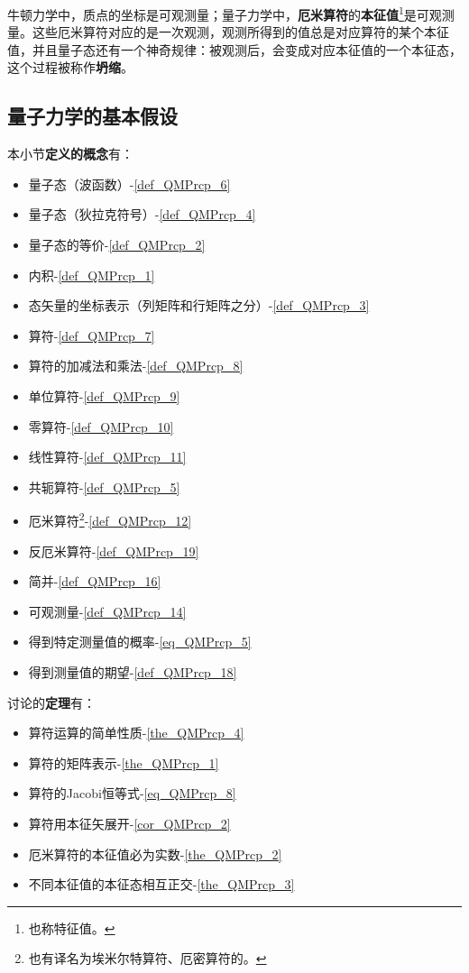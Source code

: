 牛顿力学中，质点的坐标是可观测量；量子力学中，\textbf{厄米算符}的\textbf{本征值}\footnote{也称特征值。}是可观测量。这些厄米算符对应的是一次观测，观测所得到的值总是对应算符的某个本征值，并且量子态还有一个神奇规律：被观测后，会变成对应本征值的一个本征态，这个过程被称作\textbf{坍缩}。


\subsection{量子力学的基本假设}\label{sub_QMPrcp_2}

本小节\textbf{定义的概念}有：

\begin{itemize}
\item 量子态（波函数）-\autoref{def_QMPrcp_6} 
\item 量子态（狄拉克符号）-\autoref{def_QMPrcp_4} 
\item 量子态的等价-\autoref{def_QMPrcp_2} 
\item 内积-\autoref{def_QMPrcp_1} 
\item 态矢量的坐标表示（列矩阵和行矩阵之分）-\autoref{def_QMPrcp_3} 
\item 算符-\autoref{def_QMPrcp_7} 
\item 算符的加减法和乘法-\autoref{def_QMPrcp_8} 
\item 单位算符-\autoref{def_QMPrcp_9} 
\item 零算符-\autoref{def_QMPrcp_10} 
\item 线性算符-\autoref{def_QMPrcp_11} 
\item 共轭算符-\autoref{def_QMPrcp_5} 
\item 厄米算符\footnote{也有译名为埃米尔特算符、厄密算符的。}-\autoref{def_QMPrcp_12} 
\item 反厄米算符-\autoref{def_QMPrcp_19} 
\item 简并-\autoref{def_QMPrcp_16} 
\item 可观测量-\autoref{def_QMPrcp_14} 
\item 得到特定测量值的概率-\autoref{eq_QMPrcp_5} 
\item 得到测量值的期望-\autoref{def_QMPrcp_18} 
\end{itemize}

讨论的\textbf{定理}有：

\begin{itemize}
\item 算符运算的简单性质-\autoref{the_QMPrcp_4} 
\item 算符的矩阵表示-\autoref{the_QMPrcp_1} 
\item 算符的Jacobi恒等式-\autoref{eq_QMPrcp_8} 
\item 算符用本征矢展开-\autoref{cor_QMPrcp_2} 
\item 厄米算符的本征值必为实数-\autoref{the_QMPrcp_2} 
\item 不同本征值的本征态相互正交-\autoref{the_QMPrcp_3} 
\end{itemize}

